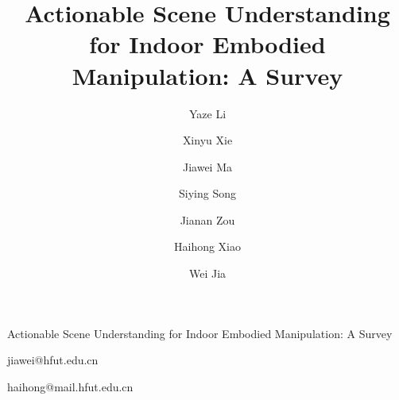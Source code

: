 \documentclass{SCIS2026}
\begin{document}
\DOI{}
\ArtNo{}
\ReceiveDate{}
\ReviseDate{}
\AcceptDate{}
\OnlineDate{}
\AuthorMark{}
\AuthorCitation{}

\title{Actionable Scene Understanding for Indoor Embodied Manipulation: A Survey}{Actionable Scene Understanding for Indoor Embodied Manipulation: A Survey}

\author[1\dag]{Yaze Li}{}
\author[1\dag]{Xinyu Xie}{}
\author[1\dag]{Jiawei Ma}{{jiawei@hfut.edu.cn}}
\author[1\dag]{Siying Song}{}
\author[2]{Jianan Zou}{}
\author[1]{Haihong Xiao}{{haihong@mail.hfut.edu.cn}}
\author[1]{Wei Jia}{}


\address[1]{School of Computer Science and Information Engineering, Hefei University of Technology, Hefei, China}
\address[2]{School of Automation Science and Engineering, South China University of Technology, Guangzhou, China}
\end{document}
